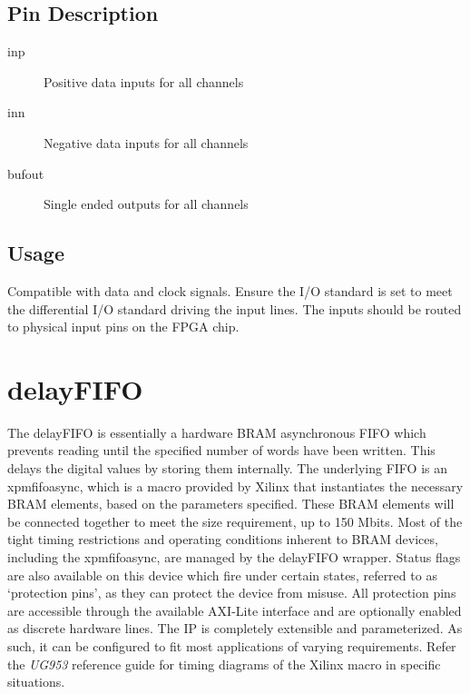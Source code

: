 \documentclass[11pt]{article}
\begin{document}
\subsection{Pin Description}
\begin{description}
	\item[in\textunderscore p]Positive data inputs for all channels
	\item[in\textunderscore n]Negative data inputs for all channels
	\item[bufout]Single ended outputs for all channels
\end{description}
\subsection{Usage}
Compatible with data and clock signals. Ensure the I/O standard is set to meet the differential I/O standard driving the input lines.
The inputs should be routed to physical input pins on the FPGA chip.

\section{delay\textunderscore FIFO}
The delay\textunderscore FIFO is essentially a hardware BRAM asynchronous FIFO which prevents reading until the specified number of words have been
written. This delays the digital values by storing them internally.\hfill\break
The underlying FIFO is an xpm\textunderscore fifo\textunderscore async, which is a
macro provided by Xilinx that instantiates the necessary BRAM elements, based on the parameters specified. These BRAM elements will be connected together 
to meet the size requirement, up to 150 Mbits. Most of the tight timing restrictions and operating conditions inherent to BRAM devices, including the
xpm\textunderscore fifo\textunderscore async, are managed by the delay\textunderscore FIFO wrapper. Status flags are also available on this device which
fire under certain states, referred to as `protection pins', as they can protect the device from misuse. All protection pins are accessible
through the available AXI-Lite interface and are optionally enabled as discrete hardware lines. The IP is completely extensible and parameterized.
As such, it can be configured to fit most applications of varying requirements. Refer the \textit{UG953} reference guide for timing diagrams of the
Xilinx macro in specific situations.
\end{document}
